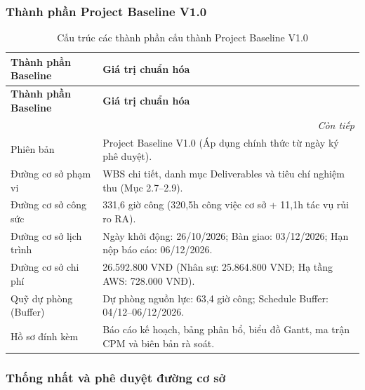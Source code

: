 \subsubsection{Thành phần Project Baseline V1.0}

\begingroup\small
\setlength{\tabcolsep}{4pt}\renewcommand{\arraystretch}{1.15}
\begin{longtable}{@{}p{.22\linewidth}p{.70\linewidth}@{}}
\caption{Cấu trúc các thành phần cấu thành Project Baseline V1.0}\label{tab:baseline}\\
\toprule
\textbf{Thành phần Baseline} & \textbf{Giá trị chuẩn hóa} \\
\midrule\endfirsthead
\toprule
\textbf{Thành phần Baseline} & \textbf{Giá trị chuẩn hóa} \\
\midrule\endhead
\midrule\multicolumn{2}{r}{\textit{Còn tiếp}}\\\endfoot
\bottomrule\endlastfoot
Phiên bản & Project Baseline V1.0 (Áp dụng chính thức từ ngày ký phê duyệt). \\
Đường cơ sở phạm vi & WBS chi tiết, danh mục Deliverables và tiêu chí nghiệm thu (Mục 2.7--2.9). \\
Đường cơ sở công sức & 331,6 giờ công (320,5h công việc cơ sở + 11,1h tác vụ rủi ro RA). \\
Đường cơ sở lịch trình & Ngày khởi động: 26/10/2026; Bàn giao: 03/12/2026; Hạn nộp báo cáo: 06/12/2026. \\
Đường cơ sở chi phí & 26.592.800 VNĐ (Nhân sự: 25.864.800 VNĐ; Hạ tầng AWS: 728.000 VNĐ). \\
Quỹ dự phòng (Buffer) & Dự phòng nguồn lực: 63,4 giờ công; Schedule Buffer: 04/12--06/12/2026. \\
Hồ sơ đính kèm & Báo cáo kế hoạch, bảng phân bổ, biểu đồ Gantt, ma trận CPM và biên bản rà soát. \\
\end{longtable}\endgroup

\subsubsection{Thống nhất và phê duyệt đường cơ sở}

